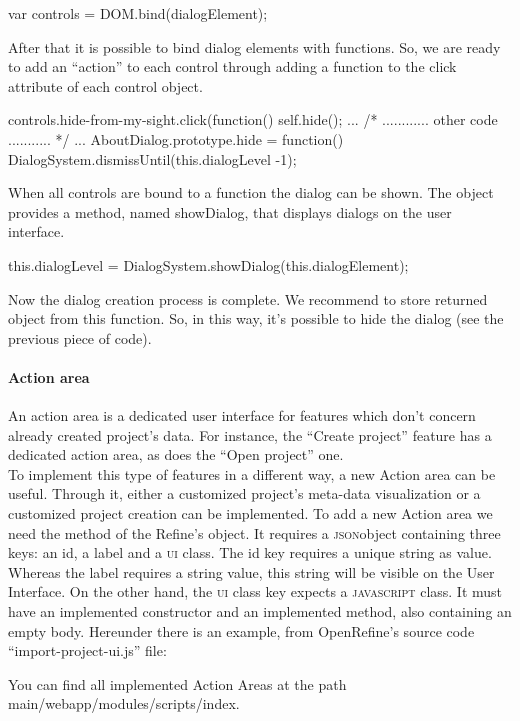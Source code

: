 \begin{code}
var controls = DOM.bind(dialogElement);
\end{code} 
After that it is possible to bind dialog elements with functions. So, we are ready to add an ``action'' to each control through adding a function to the click attribute of each control object.
\begin{code}
controls.hide-from-my-sight.click(function() { 
       self.hide(); 
}
   ...
   /* ............ other code ........... */
   ...
AboutDialog.prototype.hide = function() {
   DialogSystem.dismissUntil(this.dialogLevel -1);
}
\end{code}
When all controls are bound to a function the dialog can be shown. The  object provides a method, named showDialog, that displays dialogs on the user interface.
\begin{code}
this.dialogLevel = DialogSystem.showDialog(this.dialogElement);
\end{code}  
Now the dialog creation process is complete. We recommend to store returned object from this function. So, in this way, it's possible to hide the dialog (see the previous piece of code).

\paragraph{Action area} An action area is a dedicated user interface for features which don't concern already created project's data. For instance, the ``Create project'' feature has a dedicated action area, as does the ``Open project'' one. \\
To implement this type of features in a different way, a new Action area can be useful. Through it, either a customized project's meta-data visualization or a customized project creation can be implemented. To add a new Action area we need the  method of the Refine's  object. It requires a \textsc{json}object containing three keys: an id, a label and a \textsc{ui} class. The id key requires a unique string as value. Whereas the label requires a string value, this string will be visible on the User Interface. On the other hand, the \textsc{ui} class key expects a \textsc{javascript} class. It must have an implemented constructor and an implemented  method, also containing an empty body.
Hereunder there is an example, from OpenRefine's source code ``import-project-ui.js'' file:
You can find all implemented Action Areas at the path \textsf{main/webapp/modules/scripts/index}. 

